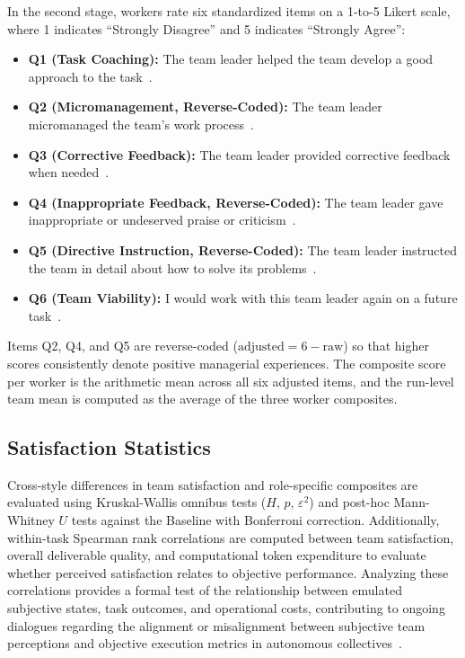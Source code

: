 In the second stage, workers rate six standardized items on a 1-to-5 Likert scale, where 1 indicates ``Strongly Disagree'' and 5 indicates ``Strongly Agree'':
\begin{itemize}
    \item \textbf{Q1 (Task Coaching):} The team leader helped the team develop a good approach to the task~\cite{wageman2005teamdiagnosticsurvey}.
    \item \textbf{Q2 (Micromanagement, Reverse-Coded):} The team leader micromanaged the team's work process~\cite{wageman2005teamdiagnosticsurvey}.
    \item \textbf{Q3 (Corrective Feedback):} The team leader provided corrective feedback when needed~\cite{wageman2005teamdiagnosticsurvey}.
    \item \textbf{Q4 (Inappropriate Feedback, Reverse-Coded):} The team leader gave inappropriate or undeserved praise or criticism~\cite{wageman2005teamdiagnosticsurvey}.
    \item \textbf{Q5 (Directive Instruction, Reverse-Coded):} The team leader instructed the team in detail about how to solve its problems~\cite{wageman2005teamdiagnosticsurvey}.
    \item \textbf{Q6 (Team Viability):} I would work with this team leader again on a future task~\cite{auberousseau2005teamgoalcommitment}.
\end{itemize}
Items Q2, Q4, and Q5 are reverse-coded ($\text{adjusted} = 6 - \text{raw}$) so that higher scores consistently denote positive managerial experiences.
The composite score per worker is the arithmetic mean across all six adjusted items, and the run-level team mean is computed as the average of the three worker composites.

\subsection{Satisfaction Statistics}
\label{subsec:satisfaction-statistics}

Cross-style differences in team satisfaction and role-specific composites are evaluated using Kruskal-Wallis omnibus tests ($H$, $p$, $\varepsilon^2$) and post-hoc Mann-Whitney $U$ tests against the Baseline with Bonferroni correction.
Additionally, within-task Spearman rank correlations are computed between team satisfaction, overall deliverable quality, and computational token expenditure to evaluate whether perceived satisfaction relates to objective performance.
Analyzing these correlations provides a formal test of the relationship between emulated subjective states, task outcomes, and operational costs, contributing to ongoing dialogues regarding the alignment or misalignment between subjective team perceptions and objective execution metrics in autonomous collectives~\cite{almutairi2025taifaautomatedfeedback, muralidharan2025lessonshumanteamsapplied}.

